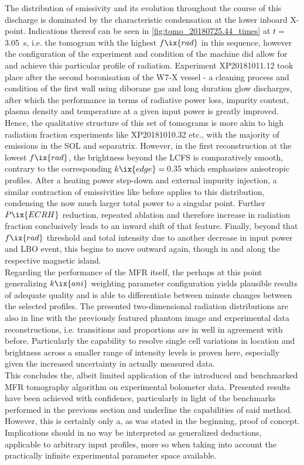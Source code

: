             The distribution of emissivity and its evolution throughout the course of this discharge is dominated by the characteristic condensation at the lower inboard X-point. Indications thereof can be seen in \cref{fig:tomo_20180725.44_times} at $t=$\SI{3.05}{\second}, i.e. the tomogram with the highest $f\ix{rad}$ in this sequence, however the configuration of the experiment and condition of the machine did allow for and achieve this particular profile of radiation. Experiment XP20181011.12 took place after the second boronisation of the W7-X vessel - a cleaning process and condition of the first wall using diborane gas and long duration glow discharges, after which the performance in terms of radiative power loss, impurity content, plasma density and temperature at a given input power is greatly improved. Hence, the qualitative structure of this set of tomograms is more akin to high radiation fraction experiments like XP20181010.32 etc., with the majority of emissions in the SOL and separatrix. However, in the first reconstruction at the lowest $f\ix{rad}$, the brightness beyond the LCFS is comparatively smooth, contrary to the corresponding $k\ix{edge}=\,$\SI{0.35}{\arbitraryunit} which emphasizes anisotropic profiles. After a heating power step-down and external impurity injection, a similar contraction of emissivities like before applies to this distribution, condensing the now much larger total power to a singular point. Further $P\ix{ECRH}$ reduction, repeated ablation and therefore increase in radiation fraction conclusively leads to an inward shift of that feature. Finally, beyond that $f\ix{rad}$ threshold and total intensity due to another decrease in input power and LBO event, this begins to move outward again, though in and along the respective magnetic island.\\%
            Regarding the performance of the MFR itself, the perhaps at this point generalizing $k\ix{ani}$ weighting parameter configuration yields plausible results of adequate quality and is able to differentiate between minute changes between the selected profiles. The presented two-dimensional radiation distributions are also in line with the previously featured phantom image and experimental data reconstructions, i.e. transitions and proportions are in well in agreement with before. Particularly the capability to resolve single cell variations in location and brightness across a smaller range of intensity levels is proven here, especially given the increased uncertainty in actually measured data.\\%
%
            \newline%
            This concludes the, albeit limited application of the introduced and benchmarked MFR tomography algorithm on experimental bolometer data. Presented results have been achieved with confidence, particularly in light of the benchmarks performed in the previous section and underline the capabilities of said method. However, this is certainly only a, as was stated in the beginning, proof of concept. Implications should in no way be interpreted as generalized deductions, applicable to arbitrary input profiles, more so when taking into account the practically infinite experimental parameter space available.%
%
